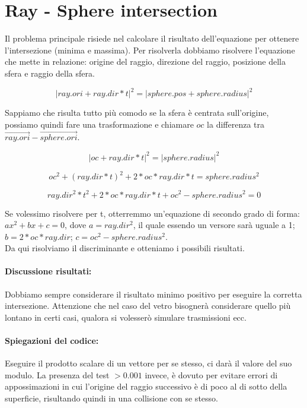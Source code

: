 \documentclass{article}
\begin{document}
\newpage
\section{Ray - Sphere intersection}

Il problema principale risiede nel calcolare il risultato dell'equazione per ottenere l'intersezione (minima e massima).
Per risolverla dobbiamo risolvere l'equazione che mette in relazione: origine del raggio, direzione del raggio, posizione della sfera e raggio della sfera.

$$| ray.ori + ray.dir * t | ^ 2 = | sphere.pos + sphere.radius | ^ 2$$

Sappiamo che risulta tutto più comodo se la sfera è centrata sull'origine, possiamo quindi fare una trasformazione e chiamare $oc$ la differenza tra $\vec{ray.ori} - \vec{sphere.ori}$.

$$| oc + ray.dir * t | ^ 2 = | sphere.radius | ^ 2$$

$$oc^2 + (ray.dir * t) ^ 2 + 2*oc*ray.dir*t = sphere.radius ^ 2$$

$$ray.dir^2 * t^2 + 2*oc*ray.dir*t + oc^2 - sphere.radius ^ 2 = 0$$

Se volessimo risolvere per t, otterremmo un'equazione di secondo grado di forma: $ax^2 + bx + c = 0$, dove $a = ray.dir^2$, il quale essendo un versore sarà uguale a 1; $b = 2*oc*ray.dir$; $c = oc^2 - sphere.radius^2$. 
\\
Da qui risolviamo il discriminante e otteniamo i possibili risultati.
\paragraph{Discussione risultati:} Dobbiamo sempre considerare il risultato minimo positivo per eseguire la corretta intersezione. Attenzione che nel caso del vetro bisognerà considerare quello più lontano in certi casi, qualora si volesserò simulare trasmissioni ecc.
\paragraph{Spiegazioni del codice:} Eseguire il prodotto scalare di un vettore per se stesso, ci darà il valore del suo modulo. La presenza del test $> 0.001$ invece, è dovuto per evitare errori di appossimazioni in cui l'origine del raggio successivo è di poco al di sotto della superficie, risultando quindi in una collisione con se stesso.
\end{document}
